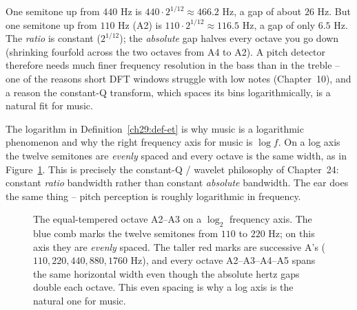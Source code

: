 \begin{example}
\label{ch29:ex-spacing}
One semitone up from $440$ Hz is $440\cdot 2^{1/12} \approx 466.2$ Hz, a gap of about $26$ Hz. But
one semitone up from $110$ Hz (A2) is $110\cdot 2^{1/12}\approx 116.5$ Hz, a gap of only $6.5$ Hz. The
\emph{ratio} is constant ($2^{1/12}$); the \emph{absolute} gap halves every octave you go
down (shrinking fourfold across the two octaves from A4 to A2). A pitch detector therefore needs much finer frequency resolution in the bass than in the
treble -- one of the reasons short DFT windows struggle with low notes (Chapter~10), and a reason the
constant-Q transform, which spaces its bins logarithmically, is a natural fit for music.
\end{example}

\begin{connectionbox}
The logarithm in Definition~\ref{ch29:def-et} is why music is a logarithmic phenomenon and why the
right frequency axis for music is $\log f$. On a log axis the twelve semitones are \emph{evenly}
spaced and every octave is the same width, as in Figure~\ref{ch29:fig-logaxis}. This is precisely the constant-Q / wavelet philosophy of
Chapter~24: constant \emph{ratio} bandwidth rather than constant \emph{absolute} bandwidth. The ear
does the same thing -- pitch perception is roughly logarithmic in frequency.
\end{connectionbox}

\begin{figure}[H]
\centering
{}
\caption{The equal-tempered octave A2--A3 on a $\log_2$ frequency axis. The blue comb marks the twelve
semitones from $110$ to $220$ Hz; on this axis they are \emph{evenly} spaced. The taller red marks are
successive A's ($110, 220, 440, 880, 1760$ Hz), and every octave A2--A3--A4--A5 spans the same
horizontal width even though the absolute hertz gaps double each octave. This even spacing is why a log
axis is the natural one for music.}
\label{ch29:fig-logaxis}
\end{figure}

